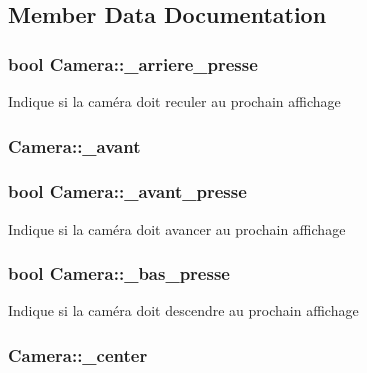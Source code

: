 \subsection{Member Data Documentation}
\hypertarget{class_camera_a0ce12f74953fcd53192e48f8b4164e2e}{
\subsubsection[{\+\_\+arriere\+\_\+presse}]{\setlength{\rightskip}{0pt plus 5cm}bool Camera\+::\+\_\+arriere\+\_\+presse}}\label{class_camera_a0ce12f74953fcd53192e48f8b4164e2e}
Indique si la caméra doit reculer au prochain affichage \hypertarget{class_camera_ab7cf8c1eae6b2f35a20e8abd1f0570c9}{
\subsubsection[{\+\_\+avant}]{ Camera\+::\+\_\+avant\hspace{0.3cm}{\ttfamily [protected]}}}\label{class_camera_ab7cf8c1eae6b2f35a20e8abd1f0570c9}
\hypertarget{class_camera_a4cab15e35a96fdcb2a8599fea13a9b8f}{
\subsubsection[{\+\_\+avant\+\_\+presse}]{\setlength{\rightskip}{0pt plus 5cm}bool Camera\+::\+\_\+avant\+\_\+presse}}\label{class_camera_a4cab15e35a96fdcb2a8599fea13a9b8f}
Indique si la caméra doit avancer au prochain affichage \hypertarget{class_camera_aaba6828f97c9ef07b6b135a665bd3008}{
\subsubsection[{\+\_\+bas\+\_\+presse}]{\setlength{\rightskip}{0pt plus 5cm}bool Camera\+::\+\_\+bas\+\_\+presse}}\label{class_camera_aaba6828f97c9ef07b6b135a665bd3008}
Indique si la caméra doit descendre au prochain affichage \hypertarget{class_camera_ad80a82cbc81e6d8ba04c7cc1ac7ba0d7}{
\subsubsection[{\+\_\+center}]{ Camera\+::\+\_\+center\hspace{0.3cm}{\ttfamily [protected]}}}\label{class_camera_ad80a82cbc81e6d8ba04c7cc1ac7ba0d7}
